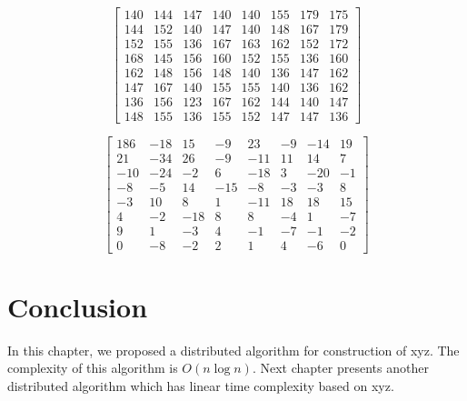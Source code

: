 \begin{equation}
    \begin{bmatrix}
        140 & 144 & 147 & 140 & 140 & 155 & 179 & 175\\ 
        144 & 152 & 140 & 147 & 140 & 148 & 167 & 179\\ 
        152 & 155 & 136 & 167 & 163 & 162 & 152 & 172\\ 
        168 & 145 & 156 & 160 & 152 & 155 & 136 & 160\\ 
        162 & 148 & 156 & 148 & 140 & 136 & 147 & 162\\ 
        147 & 167 & 140 & 155 & 155 & 140 & 136 & 162\\ 
        136 & 156 & 123 & 167 & 162 & 144 & 140 & 147\\ 
        148 & 155 & 136 & 155 & 152 & 147 & 147 & 136
    \end{bmatrix}   
\end{equation}

\begin{equation}
    \begin{bmatrix}
        186 & -18 & 15 & -9 & 23 & -9 & -14 & 19\\ 
        21 & -34 & 26 & -9 & -11 & 11 & 14 & 7\\ 
        -10 & -24 & -2 & 6 & -18 & 3 & -20 & -1\\ 
        -8 & -5 & 14 & -15 & -8 & -3 & -3 & 8\\ 
        -3 & 10 & 8 & 1 & -11 & 18 & 18 & 15\\ 
        4 & -2 & -18 & 8 & 8 & -4 & 1 & -7\\ 
        9 & 1 & -3 & 4 & -1 & -7 & -1 & -2\\ 
        0 & -8 & -2 & 2 & 1 & 4 & -6 & 0
    \end{bmatrix}
\end{equation}


\section{Conclusion}
In this chapter, we proposed a distributed algorithm
for construction of xyz.
The complexity of this algorithm is $O(n \log n)$.
Next chapter presents
another distributed algorithm which has linear time 
complexity based on xyz.

